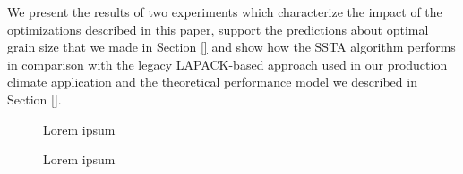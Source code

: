 \documentclass[conference]{IEEEtran}
\begin{document}
We present the results of two experiments which characterize the impact of the
optimizations described in this paper, support the predictions about optimal
grain size that we made in Section \ref{} and show how the SSTA algorithm
performs in comparison with the legacy LAPACK-based approach used in our
production climate application and the theoretical performance model we
described in Section \ref{}.

\begin{figure}[!bt]
    \centering
    \label{fig:r0}
    \caption{Lorem ipsum}
    \hspace{0mm}
    \label{fig:r1}
    \caption{Lorem ipsum}
\end{figure}
\end{document}
